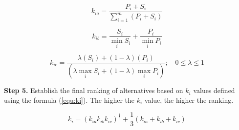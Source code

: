 \begin{equation}
\label{equ:s1}
k_{i a}=\frac{P_{i}+S_{i}}{\sum_{i=1}^{m}\left(P_{i}+S_{i}\right)}
\end{equation}

\begin{equation}
\label{equ:s2}
k_{i b}=\frac{S_{i}}{\min _{i} S_{i}}+\frac{P_{i}}{\min _{i} P_{i}}
\end{equation}

\begin{equation}
\label{equ:s3}
k_{i c}=\frac{\lambda\left(S_{i}\right)+(1-\lambda)\left(P_{i}\right)}{\left(\lambda \max _{i} S_{i}+(1-\lambda) \max _{i} P_{i}\right)} ; \quad 0 \leqslant \lambda \leqslant 1
\end{equation}

\noindent \textbf{Step 5.} Establish the final ranking of alternatives based on $k_i$ values defined using the formula (\ref{equ:ki}). The higher the $k_i$ value, the higher the ranking.

\begin{equation}
\label{equ:ki}
k_{i}=\left(k_{i a} k_{i b} k_{i c}\right)^{\frac{1}{3}}+\frac{1}{3}\left(k_{i a}+k_{i b}+k_{i c}\right)
\end{equation}
